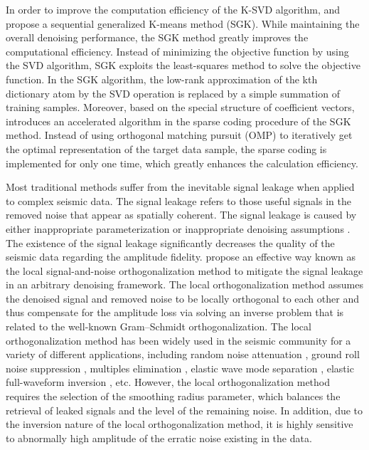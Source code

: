 In order to improve the computation efficiency of the K-SVD algorithm, \cite{yangkang2020sgk} and \cite{wang2020fast} propose a sequential generalized K-means method (SGK). While maintaining the overall denoising performance, the SGK method greatly improves the computational efficiency. Instead of minimizing the objective function by using the SVD algorithm, SGK exploits the least-squares method to solve the objective function. In the SGK algorithm, the low-rank approximation of the kth dictionary atom by the SVD operation is replaced by a simple summation of training samples. Moreover, based on the special structure of coefficient vectors, \cite{yangkang2020sgk} introduces an accelerated algorithm in the sparse coding procedure of the SGK method. Instead of using orthogonal matching pursuit (OMP) to iteratively get the optimal representation of the target data sample, the sparse coding is implemented for only one time, which greatly enhances the calculation efficiency.

Most traditional methods suffer from the inevitable signal leakage when applied to complex seismic data. The signal leakage refers to those useful signals in the removed noise that appear as spatially coherent.  The signal leakage is caused by either inappropriate parameterization or inappropriate denoising assumptions \cite[]{yangkang2015ortho}. The existence of the signal leakage significantly decreases the quality of the  seismic data regarding the amplitude fidelity. \cite{yangkang2015ortho} propose an effective way known as the local signal-and-noise orthogonalization method to mitigate the signal leakage in an arbitrary denoising framework. The local orthogonalization method assumes the denoised signal and removed noise to be locally orthogonal to each other and thus compensate for the amplitude loss via solving an inverse problem that is related to the well-known Gram–Schmidt orthogonalization. The local orthogonalization method has been widely used in the seismic community for a variety of different applications, including random noise attenuation \cite[]{yangkang2015ortho}, ground roll noise suppression \cite[]{yangkang2015orthogroll}, multiples elimination \cite[]{zhangdong2020ortho}, elastic wave mode separation \cite[]{sripanich2017elastic}, elastic full-waveform inversion \cite[]{jeong2019enhanced}, etc. However, the local orthogonalization method requires the selection of the smoothing radius parameter, which balances the retrieval of leaked signals and the level of the remaining noise. In addition, due to the inversion nature of the local orthogonalization method, it is highly sensitive to abnormally high amplitude of the erratic noise existing in the data. 

